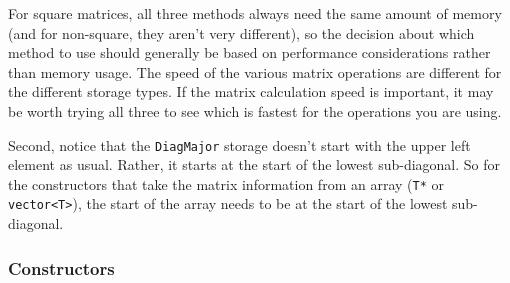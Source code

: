 \documentclass[twoside,letterpaper,11pt]{article}
\renewcommand{\tt}[1]{{\lstinline {#1}}}
\begin{document}
For square matrices, all three methods always need the same amount of memory 
(and for non-square, they aren't very different), so the 
decision about which method to use should generally be based on performance 
considerations rather than memory usage.
The speed of the various matrix operations are different for the different storage 
types.  If the matrix calculation speed is important, it may be worth trying 
all three to see which is fastest for the operations you are using.

Second, notice that the \tt{DiagMajor} storage doesn't start with the 
upper left element as usual.
Rather, it starts at the start of the lowest sub-diagonal.  
So for the constructors that 
take the matrix information from an array (\tt{T*} or \tt{vector<T>}), 
the start of the array needs to be at the start of the lowest sub-diagonal.  

\subsubsection{Constructors}
\end{document}
